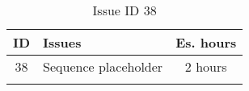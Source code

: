 \begin{longtable} { | c | p{12cm} | c | } 
\hline
	ID 	&	Issues	&		 Es. hours \\\hline
	38	&	Sequence placeholder	&	2 hours \\\hline
\caption{Issue ID 38}
\label{tab:spr3_sequenceplaceholder}
\end{longtable}
